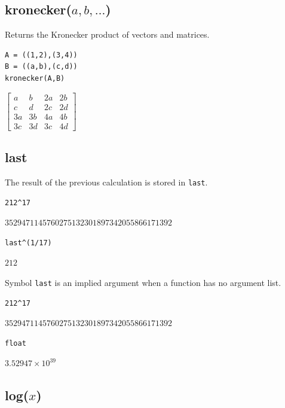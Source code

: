 \documentclass[12pt]{article}
\begin{document}
\subsection*{kronecker($a,b,\ldots$)}

Returns the Kronecker product of vectors and matrices.

{\color{blue}
\begin{verbatim}
A = ((1,2),(3,4))
B = ((a,b),(c,d))
kronecker(A,B)
\end{verbatim}
}

\noindent
$\displaystyle
\begin{bmatrix}
a & b & 2a & 2b
\\[1ex]
c & d & 2c & 2d
\\[1ex]
3a & 3b & 4a & 4b
\\[1ex]
3c & 3d & 3c & 4d
\end{bmatrix}
$

\subsection*{last}

The result of the previous calculation is stored in {\tt last}.

{\color{blue}
\begin{verbatim}
212^17
\end{verbatim}
}

\noindent
$3529471145760275132301897342055866171392$

{\color{blue}
\begin{verbatim}
last^(1/17)
\end{verbatim}
}

\noindent
$212$

\bigskip
\noindent
Symbol \verb$last$ is an implied argument when a function has no argument list.

{\color{blue}
\begin{verbatim}
212^17
\end{verbatim}
}

\noindent
$3529471145760275132301897342055866171392$

{\color{blue}
\begin{verbatim}
float
\end{verbatim}
}

\noindent
$\displaystyle 3.52947\times10^{39}$

\subsection*{log($x$)}
\end{document}
